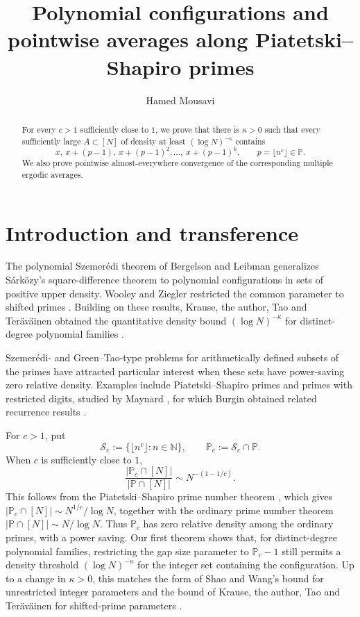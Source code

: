\documentclass[12pt]{amsart}
\title{Polynomial configurations and pointwise averages
along Piatetski--Shapiro primes}
\author[H. Mousavi]{Hamed Mousavi}
\date{}
\newcommand{\N}{\mathbb N}
\newcommand{\1}{\mathbf 1}
\begin{document}
\begin{abstract}
For every \(c>1\) sufficiently close to \(1\), we prove that there is \(\kappa>0\) such that every sufficiently large \(A\subset[N]\) of density at least \((\log N)^{-\kappa}\) contains
\[
x,\ x+(p-1),\ x+(p-1)^2,\ldots,\ x+(p-1)^k,
\qquad p=\lfloor n^c\rfloor\in\mathbb P.
\]
We also prove pointwise almost-everywhere convergence of the corresponding multiple ergodic averages.
\end{abstract}

\maketitle
\pagestyle{plain}

\section{Introduction and transference}

The polynomial Szemer\'edi theorem of Bergelson and Leibman
\cite{BergelsonLeibman} generalizes S\'ark\"ozy's
square-difference theorem \cite{SarkozySquares} to polynomial
configurations in sets of positive upper density.
Wooley and Ziegler restricted the common parameter to shifted primes
\cite{WooleyZiegler}. Building on these results, Krause, the author,
Tao and Ter\"av\"ainen obtained the quantitative density bound
$(\log N)^{-\kappa}$ for distinct-degree polynomial families
\cite[Theorem~1.2]{KMTT}.

Szemer\'edi- and Green--Tao-type problems for arithmetically
defined subsets of the primes have attracted particular
interest when these sets have power-saving zero relative
density. Examples include Piatetski--Shapiro primes
\cite{MirekPS,LiPanPS,ShaoSun} and primes with restricted
digits, studied by Maynard \cite{MaynardDigits}, for which
Burgin obtained related recurrence results \cite{BurginDigits}.

For $c>1$, put
\[
 \mathcal S_c:=\{\lfloor n^c\rfloor:n\in\N\},\qquad
 \mathbb P_c:=\mathcal S_c\cap\mathbb P.
\]
When $c$ is sufficiently close to $1$,
\[
 \frac{|\mathbb P_c\cap[N]|}{|\mathbb P\cap[N]|}
 \sim N^{-(1-1/c)}.
\]
This follows from the Piatetski--Shapiro prime number theorem
\cite{PiatetskiShapiro}, which gives
$|\mathbb P_c\cap[N]|\sim N^{1/c}/\log N$, together with the
ordinary prime number theorem
$|\mathbb P\cap[N]|\sim N/\log N$.
Thus $\mathbb P_c$ has zero relative density among the ordinary
primes, with a power saving. Our first theorem shows that, for distinct-degree
polynomial families, restricting the gap size parameter to $\mathbb P_c-1$
still permits a density threshold $(\log N)^{-\kappa}$ for the integer
set containing the configuration. Up to a change in $\kappa>0$, this
matches the form of Shao and Wang's bound for unrestricted integer
parameters \cite[Theorem~1.1]{ShaoWang} and the bound of Krause, the
author, Tao and Ter\"av\"ainen for shifted-prime parameters
\cite[Theorem~1.2]{KMTT}.
\end{document}
